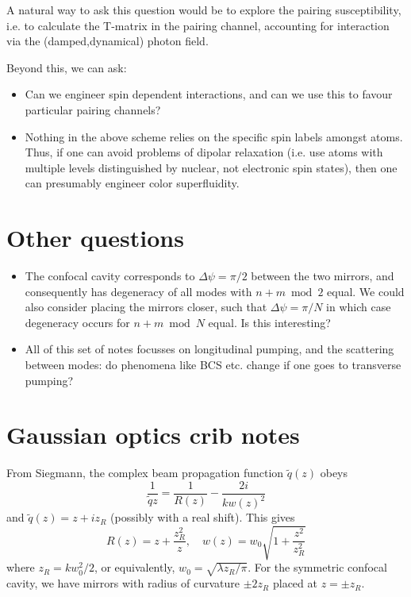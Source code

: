 \documentclass[twocolumn]{revtex4-1}
\begin{document}
A natural way to ask this question would be to explore the pairing
susceptibility, i.e. to calculate the T-matrix in the pairing channel,
accounting for interaction via the (damped,dynamical) photon field.

Beyond this, we can ask:
\begin{itemize}
\item Can we engineer spin dependent interactions, and can we use this to
  favour particular pairing channels?
\item Nothing in the above scheme relies on the specific spin labels
  amongst atoms.  Thus, if one can avoid problems of dipolar relaxation
  (i.e. use atoms with multiple levels distinguished by nuclear, not
  electronic spin states), then one can presumably engineer color
  superfluidity.
\end{itemize}

\section{Other questions}
\label{sec:other-questions}

\begin{itemize}
\item The confocal cavity corresponds to $\Delta \psi = \pi/2$ between
  the two mirrors, and consequently has degeneracy of all modes with
  $n+m \bmod 2$ equal.  We could also consider placing the mirrors
  closer, such that $\Delta \psi=  \pi/N$ in which case degeneracy
  occurs for $n+m\bmod N$ equal.  Is this interesting?
\item All of this set of notes focusses on longitudinal pumping, and
  the scattering between modes:  do phenomena like
  BCS etc. change if one goes to transverse pumping?
\end{itemize}

\appendix

\section{Gaussian optics crib notes}
\label{sec:gaussian-optics-crib}
From Siegmann, the complex beam propagation function $\tilde{q}(z)$
obeys
\begin{displaymath}
  \frac{1}{\tilde{q}{z}} = \frac{1}{R(z)} - \frac{2 i}{k w(z)^2}
\end{displaymath}
and $\tilde{q}(z) = z + i z_R$ (possibly with a real shift).  This gives
\begin{displaymath}
  R(z) = z + \frac{z_R^2}{z}, \quad
  w(z) = w_0 \sqrt{ 1 + \frac{z^2}{z_R^2}}
\end{displaymath}
where $z_R = k w_0^2/2$, or equivalently, $w_0 =\sqrt{\lambda
  z_R/\pi}$.  For the symmetric confocal cavity, we have mirrors with
radius of curvature $\pm 2 z_R$ placed at $z=\pm z_R$.  
\end{document}
